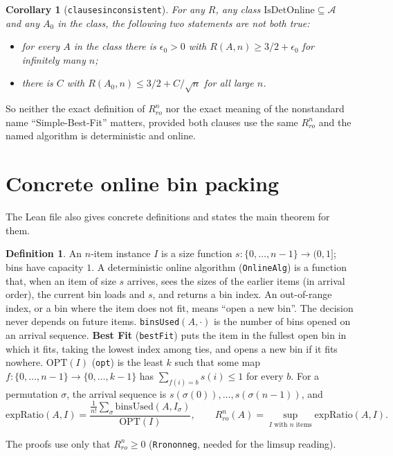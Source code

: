 \documentclass[11pt]{article}
\renewcommand{\_}{\oldus\allowbreak}
\newtheorem{corollary}[theorem]{Corollary}
\theoremstyle{definition}
\newtheorem{definition}[theorem]{Definition}
\theoremstyle{remark}
\begin{document}
\begin{corollary}[\texttt{clauses\_inconsistent}]
For any $R$, any class $\mathrm{IsDetOnline}\subseteq\mathcal{A}$ and any $A_0$ in the class,
the following two statements are not both true:
\begin{itemize}
\item for every $A$ in the class there is $\epsilon_0>0$ with $R(A,n)\ge 3/2+\epsilon_0$ for
  infinitely many $n$;
\item there is $C$ with $R(A_0,n)\le 3/2+C/\sqrt{n}$ for all large $n$.
\end{itemize}
\end{corollary}
So neither the exact definition of $R_{ro}^n$ nor the exact meaning of the nonstandard name
``Simple-Best-Fit'' matters, provided both clauses use the same $R_{ro}^n$ and the named algorithm
is deterministic and online.

\section{Concrete online bin packing}

The Lean file also gives concrete definitions and states the main theorem for them.
\begin{definition}
An $n$-item instance $I$ is a size function $s:\{0,\dots,n-1\}\to(0,1]$; bins have capacity $1$.
A deterministic online algorithm (\texttt{OnlineAlg}) is a function that, when an item of size $s$
arrives, sees the sizes of the earlier items (in arrival order), the current bin loads and $s$, and
returns a bin index. An out-of-range index, or a bin where the item does not fit, means ``open a new
bin''. The decision never depends on future items. \texttt{binsUsed}$(A,\cdot)$ is the number of
bins opened on an arrival sequence.
\textbf{Best Fit} (\texttt{bestFit}) puts the item in the fullest open bin in which it fits, taking
the lowest index among ties, and opens a new bin if it fits nowhere.
$\mathrm{OPT}(I)$ (\texttt{opt}) is the least $k$ such that some map $f:\{0,\dots,n-1\}\to\{0,\dots,k-1\}$ has
$\sum_{f(i)=b}s(i)\le 1$ for every $b$. For a permutation $\sigma$, the arrival sequence is
$s(\sigma(0)),\dots,s(\sigma(n-1))$, and
\[
\mathrm{expRatio}(A,I)=\frac{\frac{1}{n!}\sum_{\sigma}\mathrm{binsUsed}(A,I_\sigma)}{\mathrm{OPT}(I)},\qquad
R_{ro}^n(A)=\sup_{I\text{ with } n \text{ items}}\mathrm{expRatio}(A,I).
\]
\end{definition}
The proofs use only that $R_{ro}^n\ge 0$ (\texttt{Rro\_nonneg}, needed for the limsup reading).
\end{document}

